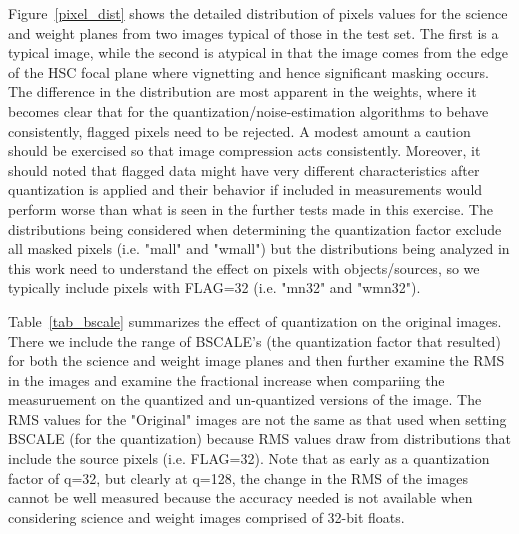 Figure~\ref{pixel_dist} shows the detailed distribution of pixels values for the science and weight planes 
from two images typical of those in the test set.  The first is a typical image, while the second is atypical
in that the image comes from the edge of the HSC focal plane where vignetting and hence significant masking 
occurs.  The difference in the distribution are most apparent in the weights, where it becomes clear that
for the quantization/noise-estimation algorithms to behave consistently, flagged pixels need to be rejected.
A modest amount a caution should be exercised so that image compression acts consistently.  Moreover, it should
noted that flagged data might have very different characteristics after quantization is applied
and their behavior if included in measurements would perform worse than what is seen in the further tests
made in this exercise.  The distributions being considered when determining the quantization factor exclude
all masked pixels (i.e. "mall" and "wmall") but the distributions being analyzed in this work need to understand
the effect on pixels with objects/sources, so we typically include pixels with FLAG=32 (i.e. "mn32" and "wmn32").

Table~\ref{tab_bscale} summarizes the effect of quantization on the original images.  There we include 
the range of BSCALE's (the quantization factor that resulted) for both the science and weight image planes
and then further examine the RMS in the images and examine the fractional increase when compariing the 
measuruement on the quantized and un-quantized versions of the image.  The RMS values for the "Original"
images are not the same as that used when setting BSCALE (for the quantization) because RMS values
draw from distributions that include the source pixels (i.e. FLAG=32).  Note that as early as a quantization
factor of q=32, but clearly at q=128, the change in the RMS of the images cannot be well measured 
because the accuracy needed is not available when considering science and weight images comprised 
of 32-bit floats.


